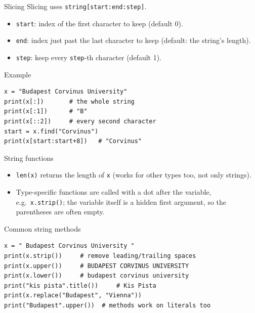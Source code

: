 \documentclass[aspectratio=169,11pt]{beamer}
\begin{document}
\begin{frame}[fragile]{Slicing}
  Slicing uses \texttt{string[start:end:step]}.
  \begin{itemize}
    \item \texttt{start}: index of the first character to keep (default 0).
    \item \texttt{end}: index just past the last character to keep (default:
          the string's length).
    \item \texttt{step}: keep every \texttt{step}-th character (default 1).
  \end{itemize}
  \begin{block}{Example}
\begin{verbatim}
x = "Budapest Corvinus University"
print(x[:])       # the whole string
print(x[:1])      # "B"
print(x[::2])     # every second character
start = x.find("Corvinus")
print(x[start:start+8])   # "Corvinus"
\end{verbatim}
  \end{block}
\end{frame}

\begin{frame}[fragile]{String functions}
  \begin{itemize}
    \item \texttt{len(x)} returns the length of \texttt{x} (works for other
          types too, not only strings).
    \item Type-specific functions are called with a dot after the variable,
          e.g.\ \texttt{x.strip()}; the variable itself is a hidden first
          argument, so the parentheses are often empty.
  \end{itemize}
  \begin{block}{Common string methods}
\begin{verbatim}
x = " Budapest Corvinus University "
print(x.strip())     # remove leading/trailing spaces
print(x.upper())     # BUDAPEST CORVINUS UNIVERSITY
print(x.lower())     # budapest corvinus university
print("kis pista".title())     # Kis Pista
print(x.replace("Budapest", "Vienna"))
print("Budapest".upper())  # methods work on literals too
\end{verbatim}
  \end{block}
\end{frame}
\end{document}
